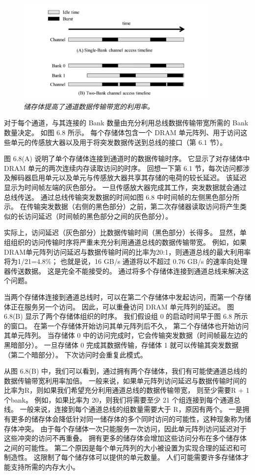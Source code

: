 \begin{figure}[H]
	\centering
	\includegraphics[width=0.9\textwidth]{figs/F6.8.png}
	\caption{\textit{储存体提高了通道数据传输带宽的利用率。}}
\end{figure}

对于每个通道，与其连接的 Bank 数量由充分利用总线数据传输带宽所需的 Bank 数量决定。 如图 6.8 所示。 
每个存储体包含一个 DRAM 单元阵列、用于访问这些单元的传感放大器以及用于将突发数据传送到总线的接口（第 6.1 节）。

图 6.8(A) 说明了单个存储体连接到通道时的数据传输时序。 它显示了对存储体中 DRAM 单元的两次连续内存读取访问的时序。 
回想一下第 6.1 节，每次访问都涉及解码器启用单元以及单元与传感放大器共享其存储的电荷的较长延迟。 
该延迟显示为时间帧左端的灰色部分。 一旦传感放大器完成其工作，突发数据就会通过总线传送。 
通过总线传输突发数据的时间如图 6.8 中时间帧的左侧黑色部分所示。 
在传输突发数据（右侧的黑色部分）之前，第二次存储器读取访问将产生类似的长访问延迟（时间帧的黑色部分之间的灰色部分）。

实际上，访问延迟（灰色部分）比数据传输时间（黑色部分）长得多。 
显然，单组组织的访问传输时序将严重未充分利用通道总线的数据传输带宽。 
例如，如果DRAM单元阵列访问延迟与数据传输时间的比率为20:1，则通道总线的最大利用率将为1/21=4.8\%； 
也就是说，16 GB/s 通道将以不超过 0.76 GB/s 的速率向处理器传送数据。 
这是完全不能接受的。 通过将多个存储体连接到通道总线来解决这个问题。

当两个存储体连接到通道总线时，可以在第二个存储体中发起访问，而第一个存储体正在服务另一个访问。 
因此，可以重叠访问 DRAM 单元阵列的延迟。 图 6.8(B) 显示了两个存储体组织的时序。 
我们假设组 0 的启动时间早于图 6.8 所示的窗口。 在第一个存储体开始访问其单元阵列后不久，
第二个存储体也开始访问其单元阵列。 当存储体 0 中的访问完成时，它会传输突发数据（时间帧最左边的黑暗部分）。 
一旦存储体 0 完成其数据传输，存储体 1 就可以传输其突发数据（第二个暗部分）。 下次访问时会重复此模式。

从图 6.8(B) 中，我们可以看到，通过拥有两个存储体，我们有可能使通道总线的数据传输带宽利用率加倍。 
一般来说，如果单元阵列访问延迟与数据传输时间的比率为R，则如果我们希望充分利用通道总线的数据传输带宽，
则至少需要R + 1个bank。 例如，如果比率为 20，则我们将需要至少 21 个组连接到每个通道总线。 
一般来说，连接到每个通道总线的组数量需要大于 R，原因有两个。 
一是拥有更多的储存体会降低针对同一储存体的多个同时访问的可能性，这种现象称为储存体冲突。 
由于每个存储体一次只能服务一次访问，因此单元阵列访问延迟对于这些冲突的访问不再重叠。 
拥有更多的储存体会增加这些访问分布在多个储存体之间的可能性。 
第二个原因是每个单元阵列的大小被设置为实现合理的延迟和可制造性。 这限制了每个储存体可以提供的单元数量。 
人们可能需要许多存储体才能支持所需的内存大小。

